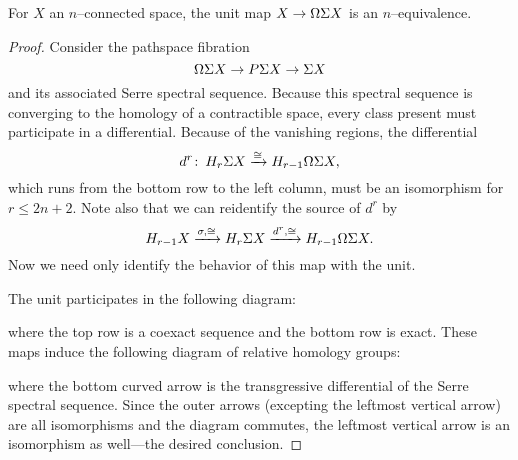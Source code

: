 \begin{theorem}[Freudenthal]\label{FreudenthalRedux}%
For $X$ an $n$--connected space, the unit map $X \to \Omega \Sigma X$ is an $n$--equivalence.
\end{theorem}
\begin{proof}
Consider the pathspace fibration \[\Omega \Sigma X \to P \Sigma X \to \Sigma X\] and its associated Serre spectral sequence.
Because this spectral sequence is converging to the homology of a contractible space, every class present must participate in a differential.
Because of the vanishing regions, the differential \[d^r\colon\thinspace H_r \Sigma X \xrightarrow\cong H_{r-1} \Omega \Sigma X,\] which runs from the bottom row to the left column, must be an isomorphism for $r \le 2n+2$.
Note also that we can reidentify the source of $d^r$ by \[H_{r-1} X \xrightarrow{\sigma, \cong} H_r \Sigma X \xrightarrow{d^r, \cong} H_{r-1} \Omega \Sigma X.\]
Now we need only identify the behavior of this map with the unit.

The unit participates in the following diagram:
\begin{center}
\end{center}
where the top row is a coexact sequence and the bottom row is exact.
These maps induce the following diagram of relative homology groups:
\begin{center}
\end{center}
where the bottom curved arrow is the transgressive differential of the Serre spectral sequence.
Since the outer arrows (excepting the leftmost vertical arrow) are all isomorphisms and the diagram commutes, the leftmost vertical arrow is an isomorphism as well---the desired conclusion.
\end{proof}

